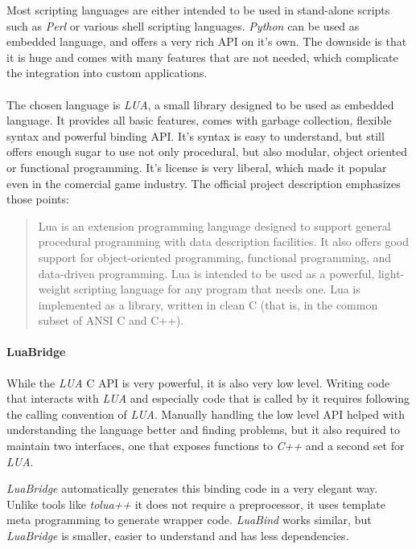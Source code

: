 Most scripting languages are either intended to be used in stand-alone scripts such as \textit{Perl} or various shell scripting languages.
\textit{Python} can be used as  embedded language, and offers a very rich API on it's own.
The downside is that it is huge and comes with many features that are not needed, which complicate
the integration into custom applications.

\paragraph{}
The chosen language is \textit{LUA}\cite{lua}, a small library designed to be used as embedded language.
It provides all basic features, comes with garbage collection, flexible syntax and powerful binding API.
It's syntax is easy to understand, but still offers enough sugar to use not only procedural, but also modular, object oriented or functional programming.
It's license is very liberal, which made it popular even in the comercial game industry.
The official project description emphasizes those points:

\begin{quotation}
Lua is an extension programming language designed to support general procedural programming with data description facilities. It also offers good support for object-oriented programming, functional programming, and data-driven programming. Lua is intended to be used as a powerful, light-weight scripting language for any program that needs one. Lua is implemented as a library, written in clean C (that is, in the common subset of ANSI C and C++).
\end{quotation}

\paragraph{LuaBridge}
While the \textit{LUA} C API is very powerful, it is also very low level.
Writing code that interacts with \textit{LUA} and especially code that is called by it requires following the calling convention of \textit{LUA}.
Manually handling the low level API helped with understanding the language better and finding problems,
but it also required to maintain two interfaces, one that exposes functions to \textit{C++} and a second set for \textit{LUA}.

\textit{LuaBridge} automatically generates this binding code in a very elegant way.
Unlike tools like \textit{tolua++} it does not require a preprocessor,
it uses template meta programming to generate wrapper code.
\textit{LuaBind} works similar, but \textit{LuaBridge} is smaller, easier to understand and has less dependencies.

